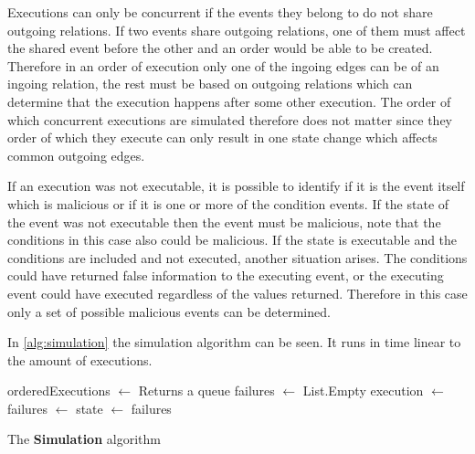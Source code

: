     Executions can only be concurrent if the events they belong to do not share outgoing relations. If two events share outgoing relations, one of them must affect the shared event before the other and an order would be able to be created. Therefore in an order of execution only one of the ingoing edges can be of an ingoing relation, the rest must be based on outgoing relations which can determine that the execution happens after some other execution. The order of which concurrent executions are simulated therefore does not matter since they order of which they execute can only result in one state change which affects common outgoing edges.
    
    \newpar If an execution was not executable, it is possible to identify if it is the event itself which is malicious or if it is one or more of the condition events. If the state of the event was not executable then the event must be malicious, note that the conditions in this case also could be malicious. If the state is executable and the conditions are included and not executed, another situation arises. The conditions could have returned false information to the executing event, or the executing event could have executed regardless of the values returned. Therefore in this case only a set of possible malicious events can be determined.

	\newpar In \autoref{alg:simulation} the simulation algorithm can be seen. It runs in time linear to the amount of executions.
	
	
	\begin{algorithm}[H]
		\begin{algorithmic}
			\State orderedExecutions $\leftarrow$  \Comment Returns a queue
			\State failures $\leftarrow$ List.Empty
				\State execution $\leftarrow$ 
					\State failures $\leftarrow$ 
				\EndIf
				\State state $\leftarrow$ 
			\EndWhile
			\State\Return failures
			\EndFunction
		\end{algorithmic}
		\caption{The \textbf{Simulation} algorithm}
		\label{alg:simulation}
	\end{algorithm}
	
